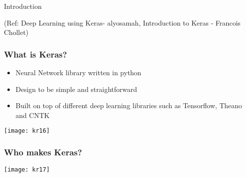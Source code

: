 %
%
%
%

\begin{frame}
  \begin{center}
    {\Large Introduction}
	
	\tiny{(Ref: Deep Learning using Keras- alyosamah, Introduction to Keras - Francois Chollet)}
   
  \end{center}
\end{frame} 

\begin{frame}[fragile] \frametitle{What is Keras?}

\begin{itemize}
\item  Neural Network library written in python
\item  Design to be simple and straightforward
\item  Built on top of different deep learning 
libraries such as Tensorflow, Theano and 
CNTK
\end{itemize}

\begin{center}
\texttt{[image: kr16]}
\end{center}

\end{frame}

\begin{frame}[fragile] \frametitle{Who makes Keras?}

\begin{center}
\texttt{[image: kr17]}
\end{center}


\end{frame}

